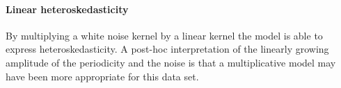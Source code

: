 \documentclass{article}
\begin{document}
\begin{figure}[h]
\centering
{}
\end{figure}


\paragraph{Linear heteroskedasticity}

By multiplying a white noise kernel by a linear kernel the model is able to express heteroskedasticity.
A post-hoc interpretation of the linearly growing amplitude of the periodicity and the noise is that a multiplicative model may have been more appropriate for this data set.
\end{document}
